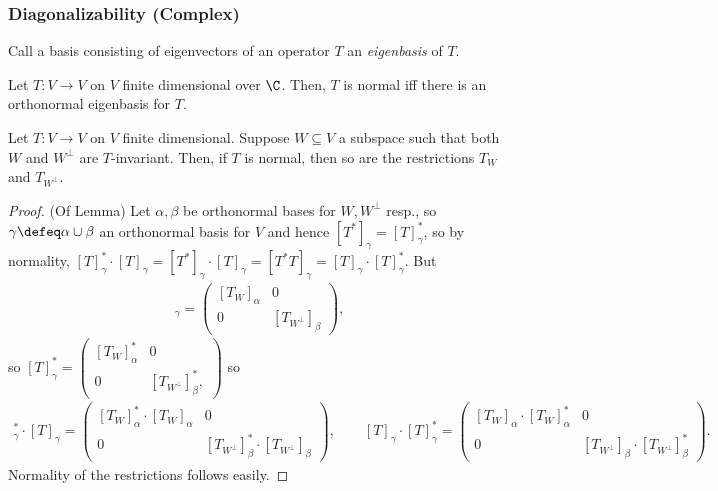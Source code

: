 \subsubsection{Diagonalizability (Complex)}
\begin{definition}[Eigenbasis]
    Call a basis consisting of eigenvectors of an operator $T$ an \emph{eigenbasis} of $T$.
\end{definition}

\begin{theorem}\label{thm:diagnormal}
    Let $T : V\to V$ on $V$ finite dimensional over $\C$. Then, $T$ is normal iff there is an orthonormal eigenbasis for $T$.
\end{theorem}

\begin{lemma}
    Let $T : V \to V$ on $V$ finite dimensional. Suppose $W \subseteq V$ a subspace such that both $W$ and $W^\perp$ are $T$-invariant. Then, if $T$ is normal, then so are the restrictions $T_W$ and $T_{W^\perp}$.
\end{lemma}

\begin{proof}(Of Lemma)
    Let $\alpha, \beta$ be orthonormal bases for $W, W^\perp$ resp., so $\gamma \defeq \alpha \cup \beta$ an orthonormal basis for $V$ and hence $[T^\ast]_\gamma = [T]^\ast_\gamma$, so by normality, $[T]_\gamma^\ast \cdot [T]_\gamma = [T^\ast]_\gamma\cdot [T]_\gamma = [T^\ast T]_\gamma = [T]_\gamma \cdot [T]_\gamma^\ast$. But \begin{align*}
        [T]_\gamma = \begin{pmatrix}
            [T_W]_\alpha & 0\\
            0 & [T_{W^\perp}]_\beta
        \end{pmatrix},
    \end{align*}
    so $[T]_\gamma^\ast = \begin{pmatrix}
        [T_W]_\alpha^\ast & 0\\
        0 & [T_{W^\perp}]_\beta^\ast,
    \end{pmatrix}$
    so \begin{align*}
        [T]_\gamma^\ast \cdot [T]_\gamma = \begin{pmatrix}
            [T_W]_\alpha^\ast \cdot [T_W]_\alpha & 0\\
            0 & [T_{W^\perp}]_\beta^\ast \cdot [T_{W^\perp}]_\beta
        \end{pmatrix}, \qquad [T]_\gamma \cdot [T]_\gamma^\ast = \begin{pmatrix}
            [T_W]_\alpha \cdot [T_W]_\alpha^\ast & 0\\
            0 & [T_{W^\perp}]_\beta \cdot [T_{W^\perp}]_\beta^\ast
        \end{pmatrix}.
    \end{align*}
    Normality of the restrictions follows easily.
\end{proof}

